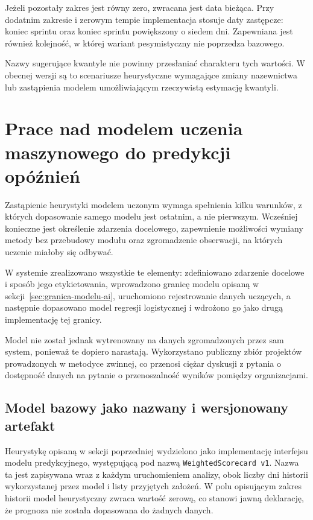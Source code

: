 Jeżeli pozostały zakres jest równy zero, zwracana jest data bieżąca. Przy dodatnim zakresie i zerowym tempie implementacja stosuje daty zastępcze: koniec sprintu oraz koniec sprintu powiększony o siedem dni. Zapewniana jest również kolejność, w której wariant pesymistyczny nie poprzedza bazowego.

Nazwy sugerujące kwantyle nie powinny przesłaniać charakteru tych wartości. W obecnej wersji są to scenariusze heurystyczne wymagające zmiany nazewnictwa lub zastąpienia modelem umożliwiającym rzeczywistą estymację kwantyli.

\section{Prace nad modelem uczenia maszynowego do predykcji opóźnień}
\label{sec:prace-nad-modelem-ml}

Zastąpienie heurystyki modelem uczonym wymaga spełnienia kilku warunków, z których dopasowanie samego modelu jest ostatnim, a nie pierwszym. Wcześniej konieczne jest określenie zdarzenia docelowego, zapewnienie możliwości wymiany metody bez przebudowy modułu oraz zgromadzenie obserwacji, na których uczenie miałoby się odbywać.

W systemie zrealizowano wszystkie te elementy: zdefiniowano zdarzenie docelowe i sposób jego etykietowania, wprowadzono granicę modelu opisaną w sekcji~\ref{sec:granica-modelu-ai}, uruchomiono rejestrowanie danych uczących, a następnie dopasowano model regresji logistycznej i wdrożono go jako drugą implementację tej granicy.

Model nie został jednak wytrenowany na danych zgromadzonych przez sam system, ponieważ te dopiero narastają. Wykorzystano publiczny zbiór projektów prowadzonych w metodyce zwinnej, co przenosi ciężar dyskusji z pytania o dostępność danych na pytanie o przenoszalność wyników pomiędzy organizacjami.

\subsection{Model bazowy jako nazwany i wersjonowany artefakt}

Heurystykę opisaną w sekcji poprzedniej wydzielono jako implementację interfejsu modelu predykcyjnego, występującą pod nazwą \texttt{WeightedScorecard v1}. Nazwa ta jest zapisywana wraz z każdym uruchomieniem analizy, obok liczby dni historii wykorzystanej przez model i listy przyjętych założeń. W polu opisującym zakres historii model heurystyczny zwraca wartość zerową, co stanowi jawną deklarację, że prognoza nie została dopasowana do żadnych danych.

